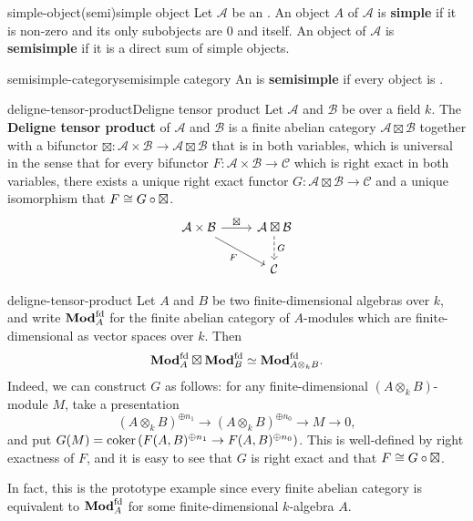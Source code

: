 \begin{topic}{simple-object}{(semi)simple object}
    Let $\mathcal{A}$ be an . An object $A$ of $\mathcal{A}$ is \textbf{simple} if it is non-zero and its only subobjects are $0$ and itself. An object of $\mathcal{A}$ is \textbf{semisimple} if it is a direct sum of simple objects.
\end{topic}

\begin{topic}{semisimple-category}{semisimple category}
    An  is \textbf{semisimple} if every object is .
\end{topic}

\begin{topic}{deligne-tensor-product}{Deligne tensor product}
    Let $\mathcal{A}$ and $\mathcal{B}$ be   over a field $k$. The \textbf{Deligne tensor product} of $\mathcal{A}$ and $\mathcal{B}$ is a finite abelian category $\mathcal{A} \boxtimes \mathcal{B}$ together with a bifunctor $\boxtimes \colon \mathcal{A} \times \mathcal{B} \to \mathcal{A} \boxtimes \mathcal{B}$ that is  in both variables, which is universal in the sense that for every bifunctor $F \colon \mathcal{A} \times \mathcal{B} \to \mathcal{C}$ which is right exact in both variables, there exists a unique right exact functor $G \colon \mathcal{A} \boxtimes \mathcal{B} \to \mathcal{C}$ and a unique  isomorphism that $F \cong G \circ \boxtimes$.
    \[ \svg \begin{tikzcd}
        \mathcal{A} \times \mathcal{B} \arrow{r}{\boxtimes} \arrow[swap]{dr}{F} & \mathcal{A} \boxtimes \mathcal{B} \arrow[dashed]{d}{G} \\
        & \mathcal{C}
    \end{tikzcd} \]
\end{topic}

\begin{example}{deligne-tensor-product}
    Let $A$ and $B$ be two finite-dimensional algebras over $k$, and write $\textbf{Mod}_A^\textup{fd}$ for the finite abelian category of $A$-modules which are finite-dimensional as vector spaces over $k$. Then
    \[ \textbf{Mod}_A^\textup{fd} \boxtimes \textbf{Mod}_B^\textup{fd} \simeq \textbf{Mod}_{A \otimes_k B}^\textup{fd} . \]
    Indeed, we can construct $G$ as follows: for any finite-dimensional $(A \otimes_k B)$-module $M$, take a presentation
    \[ (A \otimes_k B)^{\oplus n_1} \to (A \otimes_k B)^{\oplus n_0} \to M \to 0 , \]
    and put $G(M) = \operatorname{coker}\left( F(A, B)^{\oplus n_1} \to F(A, B)^{\oplus n_0} \right)$. This is well-defined by right exactness of $F$, and it is easy to see that $G$ is right exact and that $F \cong G \circ \boxtimes$.
    
    In fact, this is the prototype example since every finite abelian category is equivalent to $\textbf{Mod}_A^\textup{fd}$ for some finite-dimensional $k$-algebra $A$.
\end{example}

